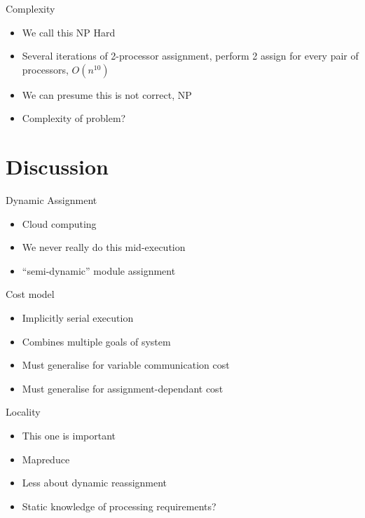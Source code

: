 \documentclass{beamer}
\begin{document}
\begin{frame}{Complexity}
\begin{itemize}
	\item We call this NP Hard
	\item Several iterations of 2-processor assignment, perform 2 assign for every pair of processors, $O(n^{10})$
	\item We can presume this is not correct, NP
	\item Complexity of problem?
\end{itemize}
\end{frame}

\section{Discussion}

\begin{frame}{Dynamic Assignment}
\begin{itemize}
	\item Cloud computing
	\item We never really do this mid-execution
	\item ``semi-dynamic'' module assignment
\end{itemize}
\end{frame}

\begin{frame}{Cost model}
\begin{itemize}
	\item Implicitly serial execution
	\item Combines multiple goals of system
	\item Must generalise for variable communication cost
	\item Must generalise for assignment-dependant cost
\end{itemize}
\end{frame}

\begin{frame}{Locality}
\begin{itemize}
	\item This one is important
	\item Mapreduce
	\item Less about dynamic reassignment
	\item Static knowledge of processing requirements?
\end{itemize}
\end{frame}
\end{document}

